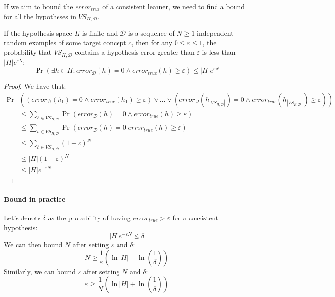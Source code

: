 If we aim to bound the $error_{true}$ of a consistent learner, we need to find a bound for all the hypotheses in $VS_{H,\mathcal{D}}$. 
\begin{theorem}
    If the hypothesis space $H$ is finite and $\mathcal{D}$ is a sequence of $N\geq 1$ independent random examples of some target concept $c$, then for any $0\leq\varepsilon\leq 1$, the probability that $VS_{H,\mathcal{D}}$ contains a hypothesis error greater than $\varepsilon$ is less than $\left\lvert H\right\rvert e^{\varepsilon N}$: 
    \[\Pr(\exists h \in H:error_{\mathcal{D}}(h)=0\land error_{true}(h)\geq\varepsilon)\leq \left\lvert H\right\rvert e^{\varepsilon N}\]
\end{theorem}
\begin{proof}
    We have that: 
    \begin{align*}
        \Pr&\left(\left(error_{\mathcal{D}}(h_1)=0\land error_{true}(h_1)\geq\varepsilon\right)\lor\ldots\lor\left(error_{\mathcal{D}}(h_{\left\lvert VS_{ H,\mathcal{D}}\right\rvert})=0\land error_{true}(h_{\left\lvert VS_{ H,\mathcal{D}}\right\rvert})\geq\varepsilon\right)\right) \\
        &\leq\sum_{h\in VS_{H,\mathcal{D}}}\Pr(error_{\mathcal{D}}(h)=0\land error_{true}(h)\geq\varepsilon) \\
        &\leq\sum_{h\in VS_{H,\mathcal{D}}}\Pr(error_{\mathcal{D}}(h)=0| error_{true}(h)\geq\varepsilon) \\
        &\leq\sum_{h\in VS_{H,\mathcal{D}}}(1-\varepsilon)^N \\
        &\leq\left\lvert H\right\rvert (1-\varepsilon)^N \\
        &\leq\left\lvert H\right\rvert e^{-\varepsilon N}
    \end{align*}
\end{proof}

\paragraph*{Bound in practice}
Let's denote $\delta$ as the probability of having $error_{true}>\varepsilon$ for a consistent hypothesis:
\[\left\lvert H\right\rvert e^{-\varepsilon N} \leq \delta\]
We can then bound $N$ after setting $\varepsilon$ and $\delta$:
\[N\geq\dfrac{1}{\varepsilon}\left(\ln\left\lvert H\right\rvert+\ln\left(\dfrac{1}{\delta}\right) \right)\]
Similarly, we can bound $\varepsilon$ after setting $N$ and $\delta$:
\[\varepsilon \geq \dfrac{1}{N}\left(\ln\left\lvert H\right\rvert+\ln\left(\dfrac{1}{\delta}\right) \right)\]

